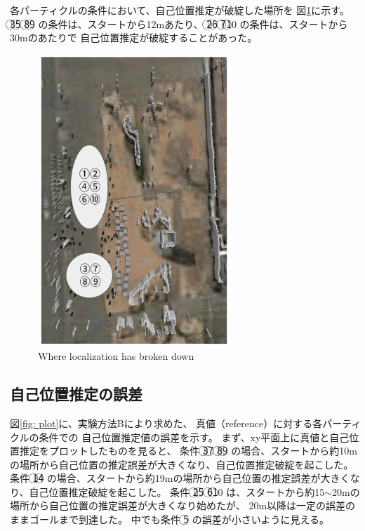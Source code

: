 \documentclass{jarticle}
\begin{document}
各パーティクルの条件において、自己位置推定が破綻した場所を
図\ref{fig: 失敗箇所}に示す。
\textcircled{\scriptsize 3}\textcircled{\scriptsize 5}\noindent
\textcircled{\scriptsize 8}\textcircled{\scriptsize 9}\noindent
の条件は、スタートから12mあたり、
\textcircled{\scriptsize 2}\textcircled{\scriptsize 6}\noindent
\textcircled{\scriptsize 7}\textcircled{\scriptsize 10}\noindent
の条件は、スタートから30mのあたりで
自己位置推定が破綻することがあった。

\begin{figure}[htbp]
  \centering
   \includegraphics[height=110mm]{fig/failure_location.png}
   \vspace*{-4mm}
   \caption{Where localization has broken down}
   \label{fig: 失敗箇所}
\end{figure}

\subsection{自己位置推定の誤差}

図\ref{fig: plot}に、実験方法Bにより求めた、
真値（reference）に対する各パーティクルの条件での
自己位置推定値の誤差を示す。
まず、xy平面上に真値と自己位置推定をプロットしたものを見ると、
条件
\textcircled{\scriptsize 3}\textcircled{\scriptsize 7}\noindent
\textcircled{\scriptsize 8}\textcircled{\scriptsize 9}\noindent
の場合、スタートから約10mの場所から自己位置の推定誤差が大きくなり、自己位置推定破綻を起こした。
条件
\textcircled{\scriptsize 1}\textcircled{\scriptsize 4}\noindent
の場合、スタートから約19mの場所から自己位置の推定誤差が大きくなり、自己位置推定破綻を起こした。
条件
\textcircled{\scriptsize 2}\textcircled{\scriptsize 5}\noindent
\textcircled{\scriptsize 6}\textcircled{\scriptsize 10}\noindent
は、スタートから約15$\sim$20mの場所から自己位置の推定誤差が大きくなり始めたが、
20m以降は一定の誤差のままゴールまで到達した。
中でも条件
\textcircled{\scriptsize 5}\noindent
の誤差が小さいように見える。
\end{document}
